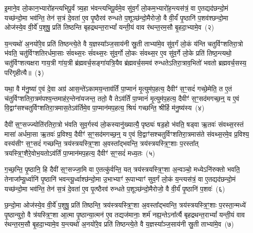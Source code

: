 इ॒माने॒व लो॒कान॒भ्यारो॑हन्त्यभिपू॒र्वं त्र्य॒हा भ॑वन्त्यभिपू॒र्वमे॒व सु॑व॒र्गं लो॒कम॒भ्यारो॑ह॒न्त्यस॑त्रं॒ वा ए॒तद्यद॑छन्दो॒मं यच्छ॑न्दो॒मा भव॑न्ति॒ तेन॑ स॒त्रं दे॒वता॑ ए॒व पृ॒ष्ठैरव॑ रुन्धते प॒शूञ्छ॑न्दो॒मैरोजो॒ वै वी॒र्यं॑ पृ॒ष्ठानि॑ प॒शव॑श्छन्दो॒मा ओज॑स्ये॒व वी॒र्ये॑ प॒शुषु॒ प्रति॑ तिष्ठन्ति बृहद्रथन्त॒रा\-भ्यां᳚ यन्ती॒यं वाव र॑थन्त॒रम॒सौ बृ॒हदा॒भ्यामे॒व~(२)

य॒न्त्यथो॑ अ॒नयो॑रे॒व प्रति॑ तिष्ठन्त्ये॒ते वै य॒ज्ञस्या᳚ञ्ज॒साय॑नी स्रु॒ती ताभ्या॑मे॒व सु॑व॒र्गं लो॒कं य॑न्ति चतुर्विꣳशतिरा॒त्रो भ॑वति॒ चतु॑र्विꣳशतिरर्धमा॒साः सं॑वथ्स॒रः सं॑वथ्स॒रः सु॑व॒र्गो लो॒कः सं॑वथ्स॒र ए॒व सु॑व॒र्गे लो॒के प्रति॑ तिष्ठ॒न्त्यथो॒ चतु॑र्विꣳशत्यक्षरा गाय॒त्री गा॑य॒त्री ब्र॑ह्मवर्च॒सङ्गा॑यत्रि॒यैव ब्र॑ह्मवर्च॒समव॑ रुन्धते\-ऽतिरा॒त्राव॒भितो॑ भवतो ब्रह्मवर्च॒सस्य॒ परि॑गृहीत्यै॥~(३)

{\anuvakamend[{अ॒सावायु॑रा॒भ्यामे॒व पञ्च॑चत्वारिꣳशच्च}]}%

यथा॒ वै म॑नु॒ष्या॑ ए॒वं दे॒वा अग्र॑ आस॒न्ते॑\-ऽकामय॒न्ताव॑र्तिं पा॒प्मानं॑ मृ॒त्युम॑प॒हत्य॒ दैवीꣳ॑ स॒ꣳ॒सदं॑ गच्छे॒मेति॒ त ए॒तं च॑तुर्विꣳशतिरा॒त्रम॑पश्य॒न्तमाह॑र॒न्तेना॑यजन्त॒ ततो॒ वै ते\-ऽव॑र्तिं पा॒प्मानं॑ मृ॒त्युम॑प॒हत्य॒ दैवीꣳ॑ स॒ꣳ॒सद॑मगच्छ॒न्॒ य ए॒वं वि॒द्वाꣳ॑सश्चतुर्विꣳशतिरा॒त्रमास॒ते\-ऽव॑र्तिमे॒व पा॒प्मान॑मप॒हत्य॒ श्रियं॑ गच्छन्ति॒ श्रीर्\mbox{}हि म॑नु॒ष्य॑स्य~(४)

दैवी॑ स॒ꣳ॒सज्ज्योति॑रतिरा॒त्रो भ॑वति सुव॒र्गस्य॑ लो॒कस्यानु॑ख्यात्यै॒ पृष्ठ्यः॑ षड॒हो भ॑वति॒ षड्वा ऋ॒तवः॑ संवथ्स॒रस्तं मासा॑ अर्धमा॒सा ऋ॒तवः॑ प्र॒विश्य॒ दैवीꣳ॑ स॒ꣳ॒सद॑मगच्छ॒न्॒ य ए॒वं वि॒द्वाꣳ॑सश्चतुर्विꣳशतिरा॒त्रमास॑ते संवथ्स॒रमे॒व प्र॒विश्य॒ वस्य॑सीꣳ स॒ꣳ॒सदं॑ गच्छन्ति॒ त्रय॑स्त्रयस्त्रि॒ꣳ॒शा अ॒वस्ता᳚द्भवन्ति॒ त्रय॑स्त्रयस्त्रि॒ꣳ॒शाः प॒रस्ता᳚त् त्रयस्त्रि॒ꣳ॒शैरे॒वोभ॒यतो\-ऽव॑र्तिं पा॒प्मान॑मप॒हत्य॒ दैवीꣳ॑ स॒ꣳ॒सदं॑ मध्य॒तः~(५)

ग॒च्छ॒न्ति॒ पृ॒ष्ठानि॒ हि दैवी॑ स॒ꣳ॒सज्जा॒मि वा ए॒तत्कु॑र्वन्ति॒ यत् त्रय॑स्त्रयस्त्रि॒ꣳ॒शा अ॒न्वञ्चो॒ मध्ये\-ऽनि॑रुक्तो भवति॒ तेनाजा᳚म्यू॒र्ध्वानि॑ पृ॒ष्ठानि॑ भवन्त्यू॒र्ध्वाश्छ॑न्दो॒मा उ॒भाभ्याꣳ॑ रू॒पाभ्याꣳ॑ सुव॒र्गं लो॒कं य॒न्त्यस॑त्रं॒ वा ए॒तद्यद॑छन्दो॒मं यच्छ॑न्दो॒मा भव॑न्ति॒ तेन॑ स॒त्रं दे॒वता॑ ए॒व पृ॒त्ष्ठैरव॑ रुन्धते प॒शूञ्छ॑न्दो॒मैरोजो॒ वै वी॒र्यं॑ पृ॒ष्ठानि॑ प॒शवः॑~(६)

छ॒न्दो॒मा ओज॑स्ये॒व वी॒र्ये॑ प॒शुषु॒ प्रति॑ तिष्ठन्ति॒ त्रय॑स्त्रयस्त्रि॒ꣳ॒शा अ॒वस्ता᳚द्भवन्ति॒ त्रय॑स्त्रयस्त्रि॒ꣳ॒शाः प॒रस्ता॒न्मध्ये॑ पृ॒ष्ठान्युरो॒ वै त्र॑यस्त्रि॒ꣳ॒शा आ॒त्मा पृ॒ष्ठान्या॒त्मन॑ ए॒व तद्यज॑मानाः॒ शर्म॑ नह्य॒न्ते\-ऽना᳚र्त्यै बृहद्रथन्त॒रा\-भ्यां᳚ यन्ती॒यं वाव र॑थन्त॒रम॒सौ बृ॒हदा॒भ्यामे॒व य॒न्त्यथो॑ अ॒नयो॑रे॒व प्रति॑ तिष्ठन्त्ये॒ते वै य॒ज्ञस्या᳚ञ्ज॒साय॑नी स्रु॒ती ताभ्या॑मे॒व~(७)


